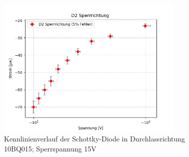 \documentclass{article}
\theoremstyle{definition}
\begin{document}
\begin{figure}[H]
    \centering
    \includegraphics[width=0.8\textwidth]{figs/dioden_d2_sperr.png}
    \caption{Kennlinienverlauf der Schottky-Diode in Durchlassrichtung 10BQ015; Sperrspannung 15V\cite{anleitung}}
    \label{dioden_d2_sperr}
\end{figure}

\clearpage
\listoffigures
\printbibliography
\end{document}
